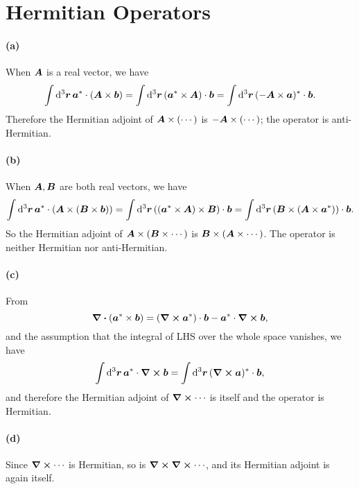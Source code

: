 \documentclass[hyperref, a4paper]{article}
\begin{document}
\section{Hermitian Operators }

\paragraph*{(a)} When $\vb*{A}$ is a real vector, we have 
\begin{equation}
    \int \dd[3]{\vb*{r}} \vb*{a}^* \cdot (\vb*{A} \times \vb*{b})
    = \int \dd[3]{\vb*{r}} (\vb*{a}^* \times \vb*{A}) \cdot \vb*{b} 
    = \int \dd[3]{\vb*{r}}(- \vb*{A} \times \vb*{a})^* \cdot {\vb*{b}}.
\end{equation}
Therefore the Hermitian adjoint of $\vb*{A} \times (\cdots)$
is $- \vb*{A} \times (\cdots)$; the operator is anti-Hermitian.

\paragraph*{(b)} When $\vb*{A}, \vb*{B}$ are both real vectors, we have 
\begin{equation}
    \int \dd[3]{\vb*{r}} \vb*{a}^* \cdot (\vb*{A} \times (\vb*{B} \times \vb*{b}))
    = \int \dd[3]{\vb*{r}} ((\vb*{a}^* \times \vb*{A}) \times \vb*{B}) \cdot \vb*{b}
    = \int \dd[3]{\vb*{r}} (\vb*{B} \times (\vb*{A} \times \vb*{a}^*)) \cdot \vb*{b}.
\end{equation}
So the Hermitian adjoint of $\vb*{A} \times (\vb*{B} \times \cdots)$
is $\vb*{B} \times (\vb*{A} \times \cdots)$.
The operator is neither Hermitian nor anti-Hermitian.

\paragraph*{(c)} From 
\[
    \div{(\vb*{a}^* \times \vb*{b})}
    = (\curl{\vb*{a}^*}) \cdot \vb*{b} 
    - \vb*{a}^* \cdot \curl{\vb*{b}}, 
\]
and the assumption that the integral of LHS over the whole space vanishes, 
we have 
\begin{equation}
    \int \dd[3]{\vb*{r}} \vb*{a}^* \cdot \curl{\vb*{b}}
    = \int \dd[3]{\vb*{r}} (\curl{\vb*{a}})^* \cdot \vb*{b} ,
\end{equation}
and therefore the Hermitian adjoint of $\curl{\cdots}$ is itself and the operator is Hermitian.

\paragraph*{(d)} Since $\curl{\cdots}$ is Hermitian, 
so is $\curl{\curl{\cdots}}$, and its Hermitian adjoint is again itself.
\end{document}
